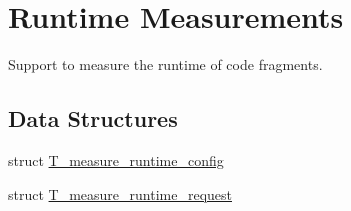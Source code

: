 \hypertarget{group__RTEMSTestFrameworkMeasureRuntime}{}\section{Runtime Measurements}
\label{group__RTEMSTestFrameworkMeasureRuntime}


Support to measure the runtime of code fragments.  


\subsection*{Data Structures}
\begin{DoxyCompactItemize}
\item 
struct \mbox{\hyperlink{structT__measure__runtime__config}{T\+\_\+measure\+\_\+runtime\+\_\+config}}
\item 
struct \mbox{\hyperlink{structT__measure__runtime__request}{T\+\_\+measure\+\_\+runtime\+\_\+request}}
\end{DoxyCompactItemize}
